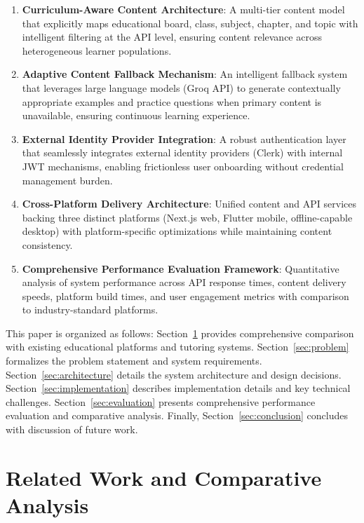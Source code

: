 \documentclass[10pt,conference,compsocconf]{IEEEtran}
\begin{document}
\begin{enumerate}
    \item \textbf{Curriculum-Aware Content Architecture}: A multi-tier content model that explicitly maps educational board, class, subject, chapter, and topic with intelligent filtering at the API level, ensuring content relevance across heterogeneous learner populations.
    
    \item \textbf{Adaptive Content Fallback Mechanism}: An intelligent fallback system that leverages large language models (Groq API) to generate contextually appropriate examples and practice questions when primary content is unavailable, ensuring continuous learning experience.
    
    \item \textbf{External Identity Provider Integration}: A robust authentication layer that seamlessly integrates external identity providers (Clerk) with internal JWT mechanisms, enabling frictionless user onboarding without credential management burden.
    
    \item \textbf{Cross-Platform Delivery Architecture}: Unified content and API services backing three distinct platforms (Next.js web, Flutter mobile, offline-capable desktop) with platform-specific optimizations while maintaining content consistency.
    
    \item \textbf{Comprehensive Performance Evaluation Framework}: Quantitative analysis of system performance across API response times, content delivery speeds, platform build times, and user engagement metrics with comparison to industry-standard platforms.
\end{enumerate}

This paper is organized as follows: Section~\ref{sec:related} provides comprehensive comparison with existing educational platforms and tutoring systems. Section~\ref{sec:problem} formalizes the problem statement and system requirements. Section~\ref{sec:architecture} details the system architecture and design decisions. Section~\ref{sec:implementation} describes implementation details and key technical challenges. Section~\ref{sec:evaluation} presents comprehensive performance evaluation and comparative analysis. Finally, Section~\ref{sec:conclusion} concludes with discussion of future work.

\section{Related Work and Comparative Analysis}
\label{sec:related}
\end{document}
